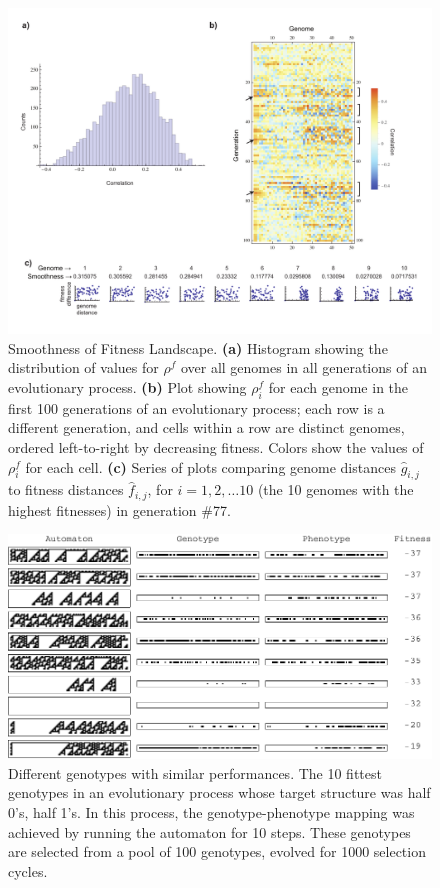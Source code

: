 \documentclass[twocolumn]{article}
\newcommand{\subfigure}[1]{\textbf{(#1)}}
\begin{document}
\begin{figure}
	\includegraphics[width=\textwidth]{figures/smoothness/smoothness.pdf}
	\caption{Smoothness of Fitness Landscape. \subfigure{a} Histogram showing the distribution of values for $\rho^f$ over all genomes in all generations of an evolutionary process. \subfigure{b} Plot showing $\rho_i^f$ for each genome in the first 100 generations of an evolutionary process; each row is a different generation, and cells within a row are distinct genomes, ordered left-to-right by decreasing fitness. Colors show the values of $\rho_i^f$ for each cell.  \subfigure{c} Series of plots comparing genome distances $\hat{g}_{i,j}$ to fitness distances $\hat{f}_{i,j}$, for $i = 1, 2, \ldots 10$ (the 10 genomes with the highest fitnesses) in generation \#77.  }
	\label{fig:smoothness}
\end{figure}

\begin{figure}
	\includegraphics[width=\textwidth]{figures/smoothness/different-genotype-similar-performance.pdf}
	\caption{Different genotypes with similar performances. The 10 fittest genotypes in an evolutionary process whose target structure was half 0's, half 1's. In this process, the genotype-phenotype mapping was achieved by running the automaton for 10 steps. These genotypes are selected from a pool of 100 genotypes, evolved for 1000 selection cycles. }
	\label{fig:similar-performance}
\end{figure}
\end{document}
